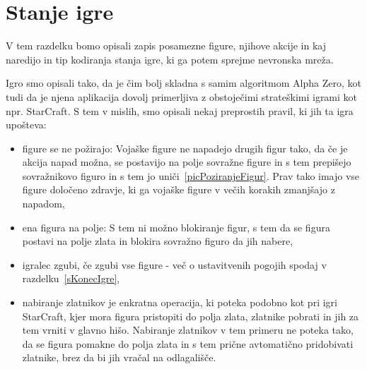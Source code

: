 \documentclass[a4paper, 12pt]{book}
\begin{document}
\section{Stanje igre}
V tem razdelku bomo opisali zapis posamezne figure, njihove akcije in kaj naredijo in tip kodiranja stanja igre, ki ga potem sprejme nevronska mreža.

Igro smo opisali tako, da je čim bolj skladna s samim algoritmom Alpha Zero, kot tudi da je njena aplikacija dovolj primerljiva z obstoječimi strateškimi igrami kot npr. StarCraft.
S tem v mislih, smo opisali nekaj preprostih pravil, ki jih ta igra upošteva:
\begin{itemize}
	\item figure se ne požirajo: Vojaške figure ne napadejo drugih figur tako, da če je akcija napad možna, se postavijo na polje sovražne figure in s tem prepišejo sovražnikovo figuro in s tem jo uniči~\ref{picPoziranjeFigur}. 
	Prav tako imajo vse figure določeno zdravje, ki ga vojaške figure v večih korakih zmanjšajo z napadom,
	\item ena figura na polje: S tem ni možno blokiranje figur, s tem da se figura postavi na polje zlata in blokira sovražno figuro da jih nabere,
	\item igralec zgubi, če zgubi vse figure - več o ustavitvenih pogojih spodaj v razdelku~\ref{sKonecIgre},
	\item nabiranje zlatnikov je enkratna operacija, ki poteka podobno kot pri igri StarCraft, kjer mora figura pristopiti do polja zlata, zlatnike pobrati in jih za tem vrniti v glavno hišo.
	Nabiranje zlatnikov v tem primeru ne poteka tako, da se figura pomakne do polja zlata in s tem prične avtomatično pridobivati zlatnike, brez da bi jih vračal na odlagališče.

\end{itemize}
\end{document}
